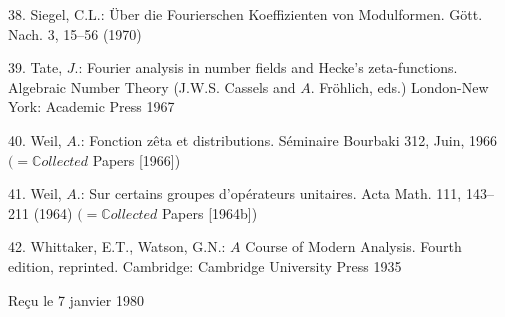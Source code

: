 \documentclass[11pt]{article}
\begin{document}
\par
38. Siegel, C.L.: Über die Fourierschen Koeffizienten von Modulformen. Gött. Nach. 3, 15--56 (1970)\par
\par
39. Tate, \(J\).: Fourier analysis in number fields and Hecke’s zeta-functions. Algebraic Number Theory (J.W.S. Cassels and \(A\). Fröhlich, eds.) London-New York: Academic Press 1967\par
\par
40. Weil, \(A\).: Fonction zêta et distributions. Séminaire Bourbaki 312, Juin, 1966 \((=\mathbb{C}ollected\) Papers [1966])\par
\par
41. Weil, \(A\).: Sur certains groupes d’opérateurs unitaires. Acta Math. 111, 143--211 (1964) \((=\mathbb{C}ollected\) Papers [1964b])\par
\par
42. Whittaker, E.T., Watson, G.N.: \(A\) Course of Modern Analysis. Fourth edition, reprinted. Cambridge: Cambridge University Press 1935\par
\par
Reçu le 7 janvier 1980\par
\end{document}

